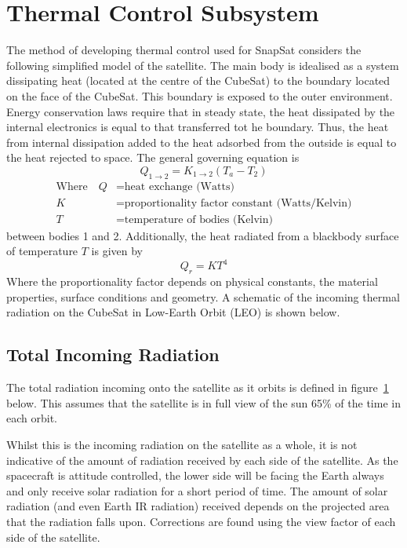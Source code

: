 \section{Thermal Control Subsystem}
The method of developing thermal control used for SnapSat considers the following simplified model of the satellite. The main body is idealised as a system dissipating heat (located at the centre of the CubeSat) to the boundary located on the face of the CubeSat. This boundary is exposed to the outer environment. Energy conservation laws require that in steady state, the heat dissipated by the internal electronics is equal to that transferred tot he boundary. Thus, the heat from internal dissipation added to the heat adsorbed from the outside is equal to the heat rejected to space. The general governing equation is
\begin{equation}
    Q_{1\rightarrow2} = K_{1\rightarrow2}(T_a - T_2)
    \label{eqn:Qconduction}
\end{equation}  
\noindent
\begin{align}
    \text{Where}\quad Q &= \text{heat exchange (Watts)} \nonumber\\
    K &= \text{proportionality factor constant (Watts/Kelvin)} \nonumber\\
    T &= \text{temperature of bodies (Kelvin)} \nonumber
\end{align}
\noindent
between bodies 1 and 2. Additionally, the heat radiated from a blackbody surface of temperature $T$ is given by 
\begin{equation}
    Q_r = KT^4
    \label{eqn:Qradiation}
\end{equation} 
\noindent
Where the proportionality factor depends on physical constants, the material properties, surface conditions and geometry. A schematic of the incoming thermal radiation on the CubeSat in Low-Earth Orbit (LEO) is shown below.
\begin{figure}[H]
\end{figure}
\noindent

\subsection{Total Incoming Radiation}
The total radiation incoming onto the satellite as it orbits is defined in figure~\ref{plot:incomingradiation} below. This assumes that the satellite is in full view of the sun 65\% of the time in each orbit.
\begin{figure}[H]
    \label{plot:incomingradiation}
\end{figure}
\noindent
Whilst this is the incoming radiation on the satellite as a whole, it is not indicative of the amount of radiation received by each side of the satellite. As the spacecraft is attitude controlled, the lower side will be facing the Earth always and only receive solar radiation for a short period of time. The amount of solar radiation (and even Earth IR radiation) received depends on the projected area that the radiation falls upon. Corrections are found using the view factor of each side of the satellite.

